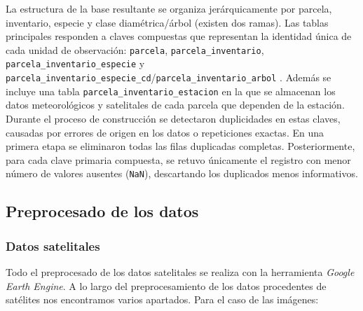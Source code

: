 \medskip

La estructura de la base resultante se organiza jerárquicamente por parcela, inventario, especie y clase diamétrica/árbol (existen dos ramas). Las tablas principales responden a claves compuestas que representan la identidad única de cada unidad de observación: \texttt{parcela}, \texttt{parcela\_inventario}, \texttt{parcela\_inventario\_especie} y \texttt{parcela\_inventario\_especie\_cd}/\texttt{parcela\_inventario\_arbol} . Además se incluye una tabla \texttt{parcela\_inventario\_estacion} en la que se almacenan los datos meteorológicos y satelitales de cada parcela que dependen de la estación. Durante el proceso de construcción se detectaron duplicidades en estas claves, causadas por errores de origen en los datos o repeticiones exactas. En una primera etapa se eliminaron todas las filas duplicadas completas. Posteriormente, para cada clave primaria compuesta, se retuvo únicamente el registro con menor número de valores ausentes (\texttt{NaN}), descartando los duplicados menos informativos.


\subsection{Preprocesado de los datos}

\subsubsection{Datos satelitales}

Todo el preprocesado de los datos satelitales se realiza con la herramienta \textit{Google Earth Engine}. A lo largo del preprocesamiento de los datos procedentes de satélites nos encontramos varios apartados. Para el caso de las imágenes:

